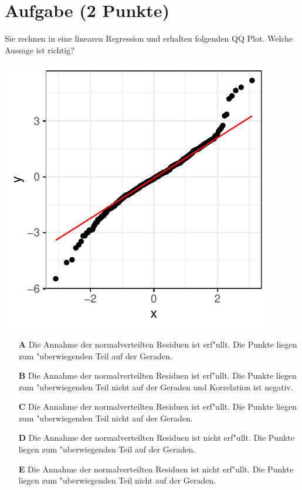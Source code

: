 \documentclass[a4paper, 10pt]{scrartcl}\usepackage[]{graphicx}\usepackage[]{color}
\makeatletter
\def\maxwidth{ %
  \ifdim\Gin@nat@width>\linewidth
    \linewidth
  \else
    \Gin@nat@width
  \fi
}
\makeatother
\begin{document}
\section{Aufgabe \hfill (2 Punkte)}

Sie rechnen in eine linearen Regression und erhalten folgenden QQ
Plot. Welche Aussage ist richtig?




{\centering \includegraphics[width=\maxwidth]{img/mc-regression-05-a-1} 

}







\begin{enumerate}
\item [\textbf{A} \msquare] Die Annahme der normalverteilten Residuen ist erf{"u}llt. Die Punkte liegen zum {"u}berwiegenden Teil auf der Geraden.
\item [\textbf{B} \msquare] Die Annahme der normalverteilten Residuen ist erf{"u}llt. Die Punkte liegen zum {"u}berwiegenden Teil nicht auf der Geraden und Korrelation ist negativ.
\item [\textbf{C} \msquare] Die Annahme der normalverteilten Residuen ist erf{"u}llt. Die Punkte liegen zum {"u}berwiegenden Teil nicht auf der Geraden.
\item [\textbf{D} \msquare] Die Annahme der normalverteilten Residuen ist nicht erf{"u}llt. Die Punkte liegen zum {"u}berwiegenden Teil auf der Geraden.
\item [\textbf{E} \msquare] Die Annahme der normalverteilten Residuen ist nicht erf{"u}llt. Die Punkte liegen zum {"u}berwiegenden Teil nicht auf der Geraden.
\end{enumerate}
\end{document}
